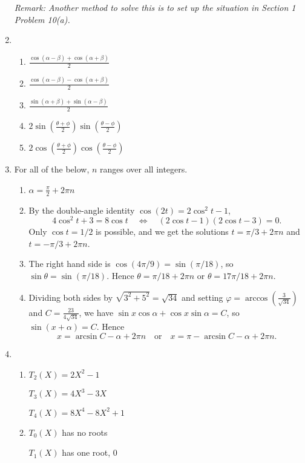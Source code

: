 \begin{enumerate}
\emph{Remark: Another method to solve this is to set up the situation in Section 1 Problem 10(a).}
\item \begin{enumerate}
\item $\frac{\cos(\alpha - \beta) + \cos(\alpha + \beta)}{2}$
\item $\frac{\cos(\alpha - \beta) - \cos(\alpha + \beta)}{2}$
\item $\frac{\sin(\alpha + \beta) + \sin(\alpha - \beta)}{2}$
\item $2\sin(\frac{\theta + \phi}{2})\sin(\frac{\theta - \phi}{2})$
\item $2\cos(\frac{\theta + \phi}{2})\cos(\frac{\theta - \phi}{2})$
\end{enumerate}
\item For all of the below, $n$ ranges over all integers.
\begin{enumerate}
\item $\alpha = \frac{\pi}{2} + 2\pi n$
\item By the double-angle identity $\cos(2t) = 2\cos^2 t - 1$,
\begin{equation*}
4\cos^2 t + 3 = 8\cos t\quad\iff\quad (2\cos t - 1)(2\cos t - 3) = 0.
\end{equation*}
Only $\cos t = 1/2$ is possible, and we get the solutions $t = \pi/3 + 2\pi n$ and $t = -\pi/3 + 2\pi n$.
\item The right hand side is $\cos(4\pi/9) = \sin(\pi/18)$, so $\sin\theta = \sin(\pi/18)$. Hence $\theta = \pi/18 + 2\pi n$ or $\theta = 17\pi/18 + 2\pi n$.
\item Dividing both sides by $\sqrt{3^2 + 5^2} = \sqrt{34}$ and setting $\varphi = \arccos(\frac{3}{\sqrt{34}})$ and $C = \frac{23}{4\sqrt{34}}$, we have $\sin x\cos\alpha + \cos x\sin\alpha = C$, so $\sin(x + \alpha) = C$. Hence
\begin{equation*}
x = \arcsin C - \alpha + 2\pi n\quad\text{or}\quad x = \pi - \arcsin C - \alpha + 2\pi n.
\end{equation*}
\end{enumerate}
\item \begin{enumerate}
\item $T_2(X) = 2X^2 - 1$\par
$T_3(X) = 4X^3 - 3X$\par
$T_4(X) = 8X^4 - 8X^2 + 1$
\item $T_0(X)$ has no roots\par 
$T_1(X)$ has one root, $0$\par

\end{enumerate}
\end{enumerate}
